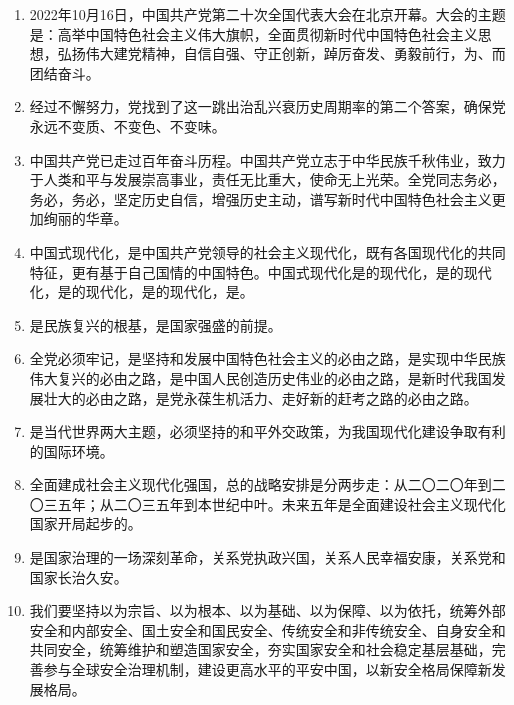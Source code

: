 \documentclass[UTF8,11pt,a4paper]{ctexart}
\begin{document}
\begin{enumerate}[label=\textbf{\arabic*.}, leftmargin=2.5em, itemsep=0.5em]
\item 2022年10月16日，中国共产党第二十次全国代表大会在北京开幕。大会的主题是：高举中国特色社会主义伟大旗帜，全面贯彻新时代中国特色社会主义思想，弘扬伟大建党精神，自信自强、守正创新，踔厉奋发、勇毅前行，为、而团结奋斗。
\item 经过不懈努力，党找到了这一跳出治乱兴衰历史周期率的第二个答案，确保党永远不变质、不变色、不变味。
\item 中国共产党已走过百年奋斗历程。中国共产党立志于中华民族千秋伟业，致力于人类和平与发展崇高事业，责任无比重大，使命无上光荣。全党同志务必，务必，务必，坚定历史自信，增强历史主动，谱写新时代中国特色社会主义更加绚丽的华章。
\item 中国式现代化，是中国共产党领导的社会主义现代化，既有各国现代化的共同特征，更有基于自己国情的中国特色。中国式现代化是的现代化，是的现代化，是的现代化，是的现代化，是。
\item {}是民族复兴的根基，是国家强盛的前提。
\item 全党必须牢记，是坚持和发展中国特色社会主义的必由之路，是实现中华民族伟大复兴的必由之路，是中国人民创造历史伟业的必由之路，是新时代我国发展壮大的必由之路，是党永葆生机活力、走好新的赶考之路的必由之路。
\item {}是当代世界两大主题，必须坚持的和平外交政策，为我国现代化建设争取有利的国际环境。
\item 全面建成社会主义现代化强国，总的战略安排是分两步走：从二〇二〇年到二〇三五年；从二〇三五年到本世纪中叶。未来五年是全面建设社会主义现代化国家开局起步的。
\item {}是国家治理的一场深刻革命，关系党执政兴国，关系人民幸福安康，关系党和国家长治久安。
\item 我们要坚持以为宗旨、以为根本、以为基础、以为保障、以为依托，统筹外部安全和内部安全、国土安全和国民安全、传统安全和非传统安全、自身安全和共同安全，统筹维护和塑造国家安全，夯实国家安全和社会稳定基层基础，完善参与全球安全治理机制，建设更高水平的平安中国，以新安全格局保障新发展格局。

\end{enumerate}
\end{document}
